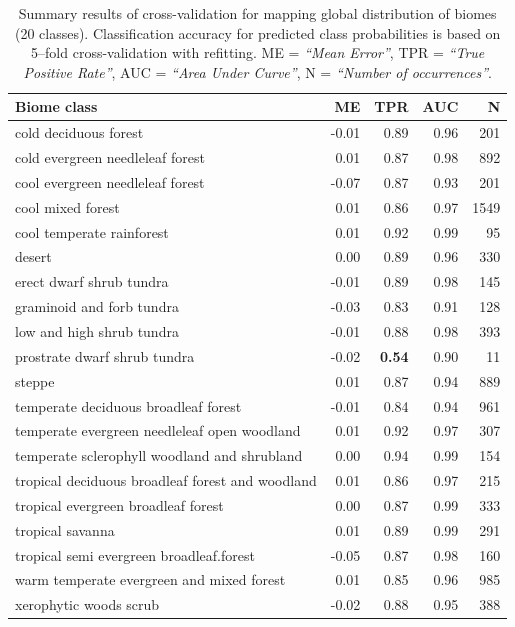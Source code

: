 \documentclass[fleqn,10pt,lineno]{wlpeerj} %
\begin{document}
\begin{table}[!hbt]
\centering
\caption{Summary results of cross-validation for mapping global distribution of biomes (20 classes). Classification accuracy for predicted class probabilities is based on 5--fold cross-validation with refitting. ME = \emph{``Mean Error''}, TPR = \emph{``True Positive Rate''}, AUC = \emph{``Area Under Curve''}, N = \emph{``Number of occurrences''}.}\label{Table_Biome_results}
\begin{tabular}{lrrrr}
\toprule
\textbf{Biome class}             & \textbf{ME} & \textbf{TPR}  & \textbf{AUC} & \textbf{N} \\
\midrule
cold deciduous forest                            & -0.01 & 0.89 & 0.96 & 201  \\
cold evergreen needleleaf forest                 & 0.01  & 0.87 & 0.98 & 892  \\
cool evergreen needleleaf forest                 & -0.07 & 0.87 & 0.93 & 201  \\
cool mixed forest                                & 0.01  & 0.86 & 0.97 & 1549 \\
cool temperate rainforest                        & 0.01  & 0.92 & 0.99 & 95   \\
desert                                           & 0.00  & 0.89 & 0.96 & 330  \\
erect dwarf shrub tundra                         & -0.01 & 0.89 & 0.98 & 145  \\
graminoid and forb tundra                        & -0.03 & 0.83 & 0.91 & 128  \\
low and high shrub tundra                        & -0.01 & 0.88 & 0.98 & 393  \\
prostrate dwarf shrub tundra                     & -0.02 & \textbf{0.54} & 0.90 & 11   \\
steppe                                           & 0.01  & 0.87 & 0.94 & 889  \\
temperate deciduous broadleaf forest             & -0.01 & 0.84 & 0.94 & 961  \\
temperate evergreen needleleaf open woodland     & 0.01  & 0.92 & 0.97 & 307  \\
temperate sclerophyll woodland and shrubland     & 0.00  & 0.94 & 0.99 & 154  \\
tropical deciduous broadleaf forest and woodland & 0.01  & 0.86 & 0.97 & 215  \\
tropical evergreen broadleaf forest              & 0.00  & 0.87 & 0.99 & 333  \\
tropical savanna                                 & 0.01  & 0.89 & 0.99 & 291  \\
tropical semi evergreen broadleaf.forest         & -0.05 & 0.87 & 0.98 & 160  \\
warm temperate evergreen and mixed forest        & 0.01  & 0.85 & 0.96 & 985  \\
xerophytic woods scrub                           & -0.02 & 0.88 & 0.95 & 388   \\     
\bottomrule
\end{tabular}
\end{table}
\end{document}
